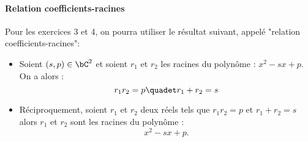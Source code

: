 \documentclass[a4paper, 11pt,reqno]{article}
\begin{document}
\paragraph{Relation coefficients-racines}
Pour les exercices 3 et 4, on pourra utiliser le résultat suivant, appelé "relation coefficients-racines": 
\begin{itemize}
\item Soient $(s, p )\in \bC^2$ et soient $r_1 $ et $r_2$ les racines du polynôme : $x^2 -sx +p.$ On a alors : 
 $$r_1 r_2 = p \quadet r_1+r_2 =s$$
 \item Réciproquement, soient $r_1$ et $r_2$ deux réels tels que $r_1 r_2 = p $ et $r_1+r_2 =s$  alors $r_1$ et $r_2$ sont les racines du polynôme : 
$$x^2 -sx +p.$$

\end{itemize}
\end{document}
